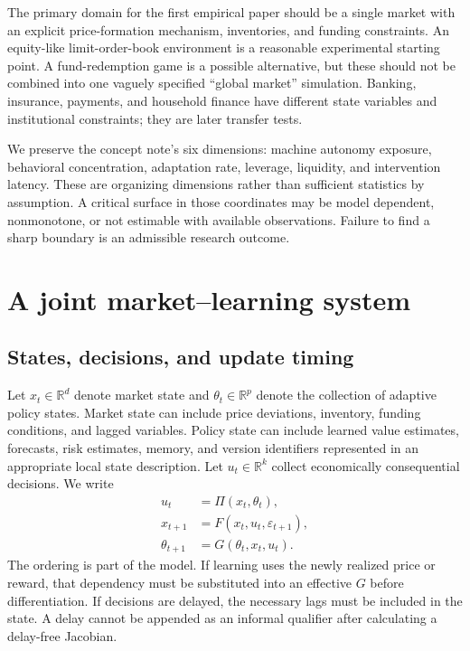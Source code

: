 \documentclass[11pt,a4paper]{article}
\theoremstyle{definition}
\theoremstyle{remark}
\newcommand{\R}{\mathbb{R}}
\begin{document}
The primary domain for the first empirical paper should be a single market with an explicit price-formation mechanism, inventories, and funding constraints. An equity-like limit-order-book environment is a reasonable experimental starting point. A fund-redemption game is a possible alternative, but these should not be combined into one vaguely specified ``global market'' simulation. Banking, insurance, payments, and household finance have different state variables and institutional constraints; they are later transfer tests.

We preserve the concept note's six dimensions: machine autonomy exposure, behavioral concentration, adaptation rate, leverage, liquidity, and intervention latency. These are organizing dimensions rather than sufficient statistics by assumption. A critical surface in those coordinates may be model dependent, nonmonotone, or not estimable with available observations. Failure to find a sharp boundary is an admissible research outcome.

\section{A joint market--learning system}
\label{sec:model}
\subsection{States, decisions, and update timing}
Let $x_t\in\R^d$ denote market state and $\theta_t\in\R^p$ denote the collection of adaptive policy states. Market state can include price deviations, inventory, funding conditions, and lagged variables. Policy state can include learned value estimates, forecasts, risk estimates, memory, and version identifiers represented in an appropriate local state description. Let $u_t\in\R^k$ collect economically consequential decisions. We write
\begin{align}
 u_t &= \Pi(x_t,\theta_t), \label{eq:policy}\\
 x_{t+1} &= F(x_t,u_t,\varepsilon_{t+1}), \label{eq:market}\\
 \theta_{t+1} &= G(\theta_t,x_t,u_t). \label{eq:learning}
\end{align}
The ordering is part of the model. If learning uses the newly realized price or reward, that dependency must be substituted into an effective $G$ before differentiation. If decisions are delayed, the necessary lags must be included in the state. A delay cannot be appended as an informal qualifier after calculating a delay-free Jacobian.
\end{document}
